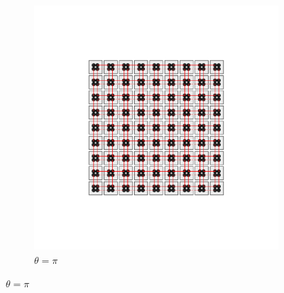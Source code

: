 \begin{figure}[h!]
\begin{minipage}[h!]{1\textwidth}
\begin{subfigure}[b!]{0.2 \textwidth}
         \end{subfigure}\hspace*{-0.5em}
         \begin{subfigure}[b!]{0.2 \textwidth}
             \caption*{$\theta = \pi$}
             \includegraphics[width=\textwidth]{Imagenes/Models/Model_pump/square_pump_model_xy_16.pdf}
         \end{subfigure}\hspace*{-0.5em}
     \end{minipage}\vspace*{-1em}
     

\end{figure}
